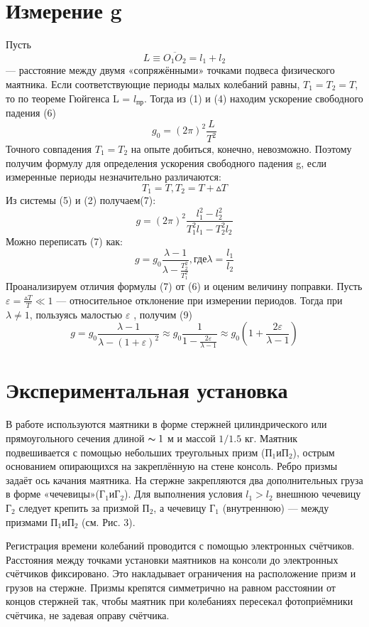 \documentclass[a4paper]{article}
\begin{document}
\section{Измерение g}
Пусть \[L \equiv \overline{O_{1}O_{2}}  = l_{1} + l_{2}\] — расстояние между двумя «сопряжёнными» 
точками подвеса физического маятника. Если соответствующие периоды 
малых колебаний равны, $T_{1}=T_{2}=T$, то по теореме Гюйгенса L = ${l_\text{пр}}$. Тогда из (1) и (4) находим ускорение свободного падения (6)
\[g_{0}=(2\pi)^2\frac{L}{T^2}\]
Точного совпадения $T_{1}=T_{2}$ на опыте добиться, конечно, невозможно. 
Поэтому получим формулу для определения ускорения свободного падения g, если измеренные периоды незначительно различаются:
\[T_{1}=T, T_{2}=T+\vartriangle T\]
Из системы (5) и (2) получаем(7):
\[g=(2\pi )^2\frac{l_{1}^2-l_{2}^2}{T_{1}^2l_{1}-T_{2}^2l_{2}}\]
Можно переписать (7) как:
\[g=g_{0}\frac{\lambda-1}{\lambda - \frac{T_{2}^2}{T_{1}^2} }, \text{где} \lambda = \frac{l_{1}}{l_{2}}\]
Проанализируем отличия формулы (7) от (6) и оценим величину поправки. Пусть $\varepsilon = \frac{\vartriangle T}{T}\ll 1 $
— относительное отклонение при измерении периодов. Тогда при $\lambda\neq 1$, пользуясь малостью $\varepsilon$ , получим (9)
\[g = g_{0}\frac{\lambda -1}{\lambda -(1+\varepsilon )^2}\approx g_{0}\frac{1}{1-\frac{2\varepsilon }{\lambda -1} }\approx g_{0}(1+\frac{2\varepsilon }{\lambda -1} )\]  


\section{Экспериментальная установка}
В работе используются маятники в форме стержней цилиндрического
или прямоугольного сечения длиной $\thicksim 1$ м и массой $1/1.5$ кг. Маятник 
подвешивается с помощью небольших треугольных призм ($\text{П}_{1} \text{и} \text{П}_{2}$), острым основанием опирающихся на закреплённую на стене консоль. Ребро 
призмы задаёт ось качания маятника. На стержне закрепляются два дополнительных груза в форме «чечевицы»($\text{Г}_{1} \text{и} \text{Г}_{2}$). Для выполнения условия 
$l_{1}>l_{2}$ внешнюю чечевицу $\text{Г}_{2}$ следует крепить за призмой $\text{П}_{2}$, а чечевицу $\text{Г}_{1}$
(внутреннюю) — между призмами $\text{П}_{1} \text{и} \text{П}_{2}$ (см. Рис. 3).\par
Регистрация времени колебаний проводится с помощью электронных 
счётчиков. Расстояния между точками установки маятников на консоли до 
электронных счётчиков фиксировано. Это накладывает ограничения на расположение призм и грузов на стержне. Призмы крепятся симметрично
на равном расстоянии от концов стержней так, чтобы маятник при колебаниях пересекал фотоприёмники счётчика, не задевая оправу счётчика. 
\end{document}
